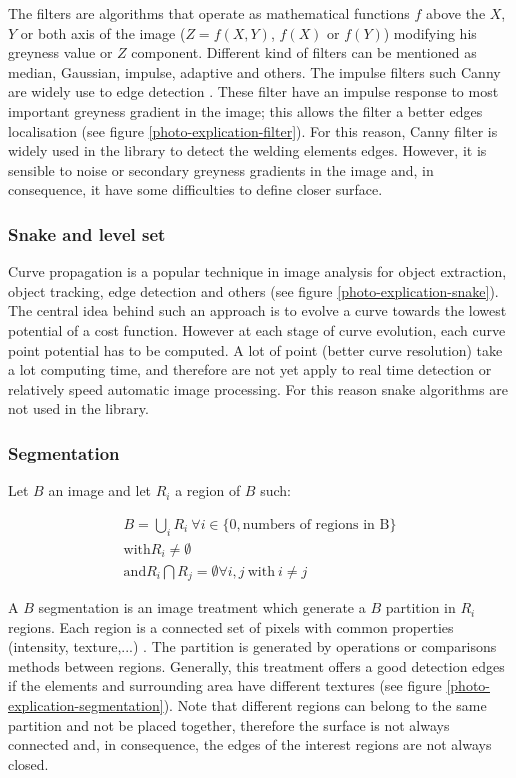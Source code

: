 \documentclass[12pt]{iopart}
\begin{document}
The filters are algorithms that operate as mathematical functions $f$ above the 
$X$, $Y$ or both axis of the image ($Z = f(X,Y)$,  
$f(X)$ or $f(Y)$)  modifying his greyness value or $Z$ component. 
Different kind of filters can be mentioned as median, Gaussian, impulse,
 adaptive and others. The impulse filters such Canny are 
widely use to edge detection \cite{COCQUEREZ}. These filter have an
 impulse response to most important greyness gradient in the 
image; this allows the filter a better edges localisation
 (see figure \ref{photo-explication-filter}). 
For this reason, Canny filter is widely 
used in the library to detect the welding elements edges. 
However, it is sensible to noise or secondary greyness gradients in the image
 and, in consequence, it have some difficulties to define closer surface.

\subsubsection{Snake and level set}
\label{snake-and-level-set}
 
Curve propagation is a popular technique in image analysis for object extraction,
 object tracking, edge detection and others (see figure 
\ref{photo-explication-snake}). The central idea behind such an approach
 is to evolve a curve towards the lowest potential of a cost function. 
However at each stage of curve evolution, each curve point potential has
 to be computed. A lot of point (better curve resolution) take a lot 
computing time, and therefore are not yet apply to real time detection
 or relatively speed automatic image processing. For this reason snake algorithms are not used in the library.

\subsubsection{Segmentation}
\label{segmentation}

Let $B$ an image and let $R_{i}$ a region of $B$ such:

\begin{eqnarray}
B = \bigcup_{i}R_{i}\ \forall i \in \{0, \mbox{numbers of regions in B}\} \\
\mbox{with} R_{i} \neq \emptyset \\
\mbox{and}  R_{i}\bigcap R_{j} = \emptyset  \forall i, j\ \mbox{with}\ i \neq j\ 
\label{equation-segmentation}
\end{eqnarray}

A $B$ segmentation is an image treatment which generate a $B$ partition in $R_{i}$ regions. 
Each region is a connected set of pixels with 
common properties (intensity, texture,...) \cite{COCQUEREZ}.
 The partition is generated by operations or comparisons methods between 
regions. Generally, this treatment offers a good detection edges if
 the elements and surrounding area have different textures (see figure
 \ref{photo-explication-segmentation}). 
Note that different regions can belong to the same partition and not
 be placed together, therefore the surface is not always connected and,
 in consequence, the edges of the interest regions are not always closed.
\end{document}
